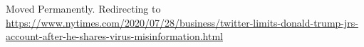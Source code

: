Moved Permanently. Redirecting to
\url{https://www.nytimes.com/2020/07/28/business/twitter-limits-donald-trump-jrs-account-after-he-shares-virus-misinformation.html}
